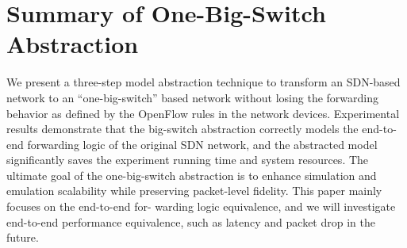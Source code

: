 \section{Summary of One-Big-Switch Abstraction}
\label{OBS:Sec:Conclusion}

We present a three-step model abstraction technique to transform an SDN-based network to
an ``one-big-switch'' based network without losing the forwarding behavior as
defined by the OpenFlow rules in the network devices.
Experimental results demonstrate that the big-switch abstraction correctly models
the end-to-end forwarding logic of the original SDN network,
and the abstracted model significantly saves the experiment running time and system resources.
The ultimate goal of the one-big-switch abstraction is to enhance simulation and emulation scalability while preserving packet-level fidelity.
This paper mainly focuses on the end-to-end for- warding logic equivalence,
and we will investigate end-to-end performance equivalence, such as latency and packet drop in the future.
